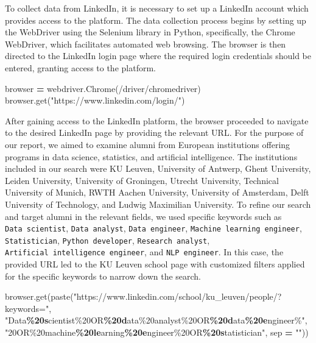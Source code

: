 \documentclass[11pt,]{article}
\newenvironment{Shaded}{\begin{snugshade}}{\end{snugshade}}
\newcommand{\NormalTok}[1]{#1}
\newcommand{\OperatorTok}[1]{\textcolor[rgb]{0.81,0.36,0.00}{\textbf{#1}}}
\newcommand{\SpecialCharTok}[1]{\textcolor[rgb]{0.81,0.36,0.00}{\textbf{#1}}}
\newcommand{\StringTok}[1]{\textcolor[rgb]{0.31,0.60,0.02}{#1}}
\begin{document}
To collect data from LinkedIn, it is necessary to set up a LinkedIn
account which provides access to the platform. The data collection
process begins by setting up the WebDriver using the Selenium library in
Python, specifically, the Chrome WebDriver, which facilitates automated
web browsing. The browser is then directed to the LinkedIn login page
where the required login credentials should be entered, granting access
to the platform.

\begin{Shaded}
\begin{Highlighting}[]
\NormalTok{browser }\OperatorTok{=}\NormalTok{ webdriver.Chrome(}\StringTok{\textquotesingle{}/driver/chromedriver\textquotesingle{}}\NormalTok{)}
\NormalTok{browser.get(}\StringTok{"https://www.linkedin.com/login/"}\NormalTok{)}
\end{Highlighting}
\end{Shaded}

After gaining access to the LinkedIn platform, the browser proceeded to
navigate to the desired LinkedIn page by providing the relevant URL. For
the purpose of our report, we aimed to examine alumni from European
institutions offering programs in data science, statistics, and
artificial intelligence. The institutions included in our search were KU
Leuven, University of Antwerp, Ghent University, Leiden University,
University of Groningen, Utrecht University, Technical University of
Munich, RWTH Aachen University, University of Amsterdam, Delft
University of Technology, and Ludwig Maximilian University. To refine
our search and target alumni in the relevant fields, we used specific
keywords such as \texttt{Data\ scientist}, \texttt{Data\ analyst},
\texttt{Data\ engineer}, \texttt{Machine\ learning\ engineer},
\texttt{Statistician}, \texttt{Python\ developer},
\texttt{Research\ analyst}, \texttt{Artificial\ intelligence\ engineer},
and \texttt{NLP\ engineer}. In this case, the provided URL led to the KU
Leuven school page with customized filters applied for the specific
keywords to narrow down the search.

\begin{Shaded}
\begin{Highlighting}[]
\NormalTok{browser.get(paste(}\StringTok{"https://www.linkedin.com/school/ku\_leuven/people/?keywords="}\NormalTok{,}
                  \StringTok{"Data}\SpecialCharTok{\%20s}\StringTok{cientist\%20OR}\SpecialCharTok{\%20d}\StringTok{ata\%20analyst\%20OR}\SpecialCharTok{\%20d}\StringTok{ata}\SpecialCharTok{\%20e}\StringTok{ngineer\%"}\NormalTok{,}
                  \StringTok{"20OR\%20machine}\SpecialCharTok{\%20le}\StringTok{arning}\SpecialCharTok{\%20e}\StringTok{ngineer\%20OR}\SpecialCharTok{\%20s}\StringTok{tatistician"}\NormalTok{, }
\NormalTok{                  sep }\OperatorTok{=} \StringTok{""}\NormalTok{))}
\end{Highlighting}
\end{Shaded}
\end{document}
